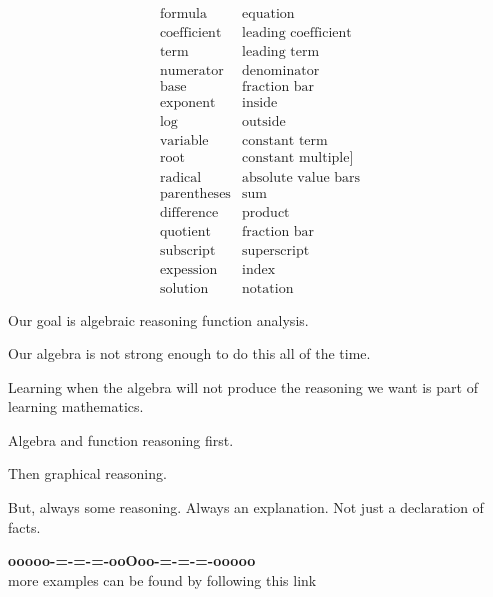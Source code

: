 \documentclass{ximera}
\begin{document}
\[
\begin{array}{ll}
\text{formula}  & \text{equation}  \\
\text{coefficient}  & \text{leading coefficient} \\
\text{term}    &  \text{leading term} \\
\text{numerator}  & \text{denominator} \\
\text{base}   & \text{fraction bar} \\
\text{exponent} & \text{inside} \\
\text{log} & \text{outside} \\
\text{variable} & \text{constant term} \\
\text{root} &  \text{constant multiple]} \\ 
\text{radical} &  \text{absolute value bars} \\
\text{parentheses} &  \text{sum}  \\
\text{difference} &  \text{product}  \\
\text{quotient} &  \text{fraction bar} \\
\text{subscript} &  \text{superscript} \\
\text{expession} &  \text{index} \\
\text{solution} &  \text{notation} 
\end{array}
\]



Our goal is algebraic reasoning function analysis.

Our algebra is not strong enough to do this all of the time.





Learning when the algebra will not produce the reasoning we want is part of learning mathematics.  

Algebra and function reasoning first. 

Then graphical reasoning.  


But, always some reasoning.  Always an explanation. Not just a declaration of facts.











\begin{center}
\textbf{\textcolor{green!50!black}{ooooo-=-=-=-ooOoo-=-=-=-ooooo}} \\

more examples can be found by following this link\\ 

\end{center}
\end{document}

